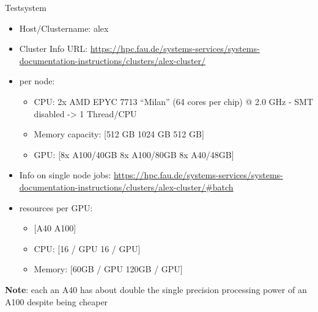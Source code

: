 \documentclass[ignorenonframetext,]{beamer}
\providecommand{\tightlist}{%
  \setlength{\itemsep}{0pt}\setlength{\parskip}{0pt}}
\begin{document}
\begin{frame}

\begin{block}{Testsystem}

\begin{itemize}
\tightlist
\item
  Host/Clustername: alex
\item
  Cluster Info URL:
  \href{https://hpc.fau.de/systems-services/systems-documentation-instructions/clusters/alex-cluster/}{https://hpc.fau.de/systems-services/systems-documentation-instructions/clusters/alex-cluster/}
\item
  per node:

  \begin{itemize}
  \tightlist
  \item
    CPU: 2x AMD EPYC 7713 ``Milan'' (64 cores per chip) @ 2.0 GHz - SMT
    disabled -\textgreater{} 1 Thread/CPU
  \item
    Memory capacity: {[}512 GB \textbar{} 1024 GB \textbar{} 512 GB{]}
  \item
    GPU: {[}8x A100/40GB \textbar{} 8x A100/80GB \textbar{} 8x
    A40/48GB{]}
  \end{itemize}
\item
  Info on single node jobs:
  \href{https://hpc.fau.de/systems-services/systems-documentation-instructions/clusters/alex-cluster/\#batch}{https://hpc.fau.de/systems-services/systems-documentation-instructions/clusters/alex-cluster/\#batch}
\item
  resources per GPU:

  \begin{itemize}
  \tightlist
  \item
    {[}A40 \textbar{} A100{]}
  \item
    CPU: {[}16 / GPU \textbar{} 16 / GPU{]}
  \item
    Memory: {[}60GB / GPU \textbar{} 120GB / GPU{]}
  \end{itemize}
\end{itemize}

\textbf{Note}: each an A40 has about double the single precision
processing power of an A100 despite being cheaper

\end{block}

\end{frame}
\end{document}
